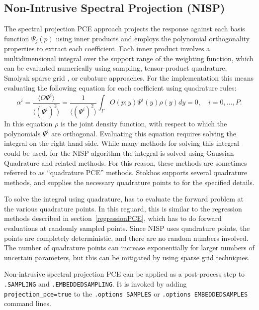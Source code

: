 \subsection{Non-Intrusive Spectral Projection (NISP)}
\label{nisp}
The spectral projection PCE approach projects the response
against each basis function $\Psi_j(p)$ using inner
products and employs the polynomial orthogonality properties to
extract each coefficient. Each inner product involves a
multidimensional integral over the support range of the weighting
function, which can be evaluated numerically using sampling,
tensor-product quadrature, Smolyak sparse grid \cite{Smolyak_63}, or
cubature \cite{stroud} approaches.   For the \Xyce{} implementation 
this means evaluating the following equation for each coefficient using 
quadrature rules:
\begin{equation}
\alpha^{i} = \frac{\langle O\varPsi ^{i}\rangle} {\langle (\varPsi ^{i})^{2}\rangle} = \frac{1} {\langle (\varPsi^{i})^{2}\rangle}\int _{\varGamma}O(p ;y)\varPsi ^{i}(y)\rho (y)dy = 0,\quad i = 0,\ldots,P.
  \label{nispProjection}
\end{equation}
In this equation $\rho$ is the joint density function, with respect to which the polynomials $\varPsi^i$ are orthogonal.
Evaluating this equation requires solving the integral on the right hand side.  
While many methods for solving this integral could be used, for the NISP algorithm 
the integral is solved using Gaussian Quadrature and related methods.  For this 
reason, these methods are sometimes referred to as ``quadrature PCE'' methods.
Stokhos supports several quadrature methods, and supplies the necessary quadrature points 
to \Xyce{} for the specified details.  

To solve the integral using quadrature, \Xyce{} has to evaluate the forward problem at 
the various quadrature points. In this reguard, this is similar to the
regression methods described in section~\ref{regressionPCE}, which has to do 
forward evaluations at randomly sampled points.
Since NISP uses quadrature points, the points are completely deterministic, 
and there are no random numbers involved.
The number of quadrature points can increase exponentially for larger numbers of uncertain 
parameters, but this can be mitigated by using sparse grid techniques.  

Non-intrusive spectral projection PCE can be applied as a post-process step 
to \texttt{.SAMPLING} and \texttt{.EMBEDDEDSAMPLING}.  It is invoked by adding 
\texttt{projection\_pce=true} to the \texttt{.options SAMPLES} 
or \texttt{.options EMBEDDEDSAMPLES} command lines.

